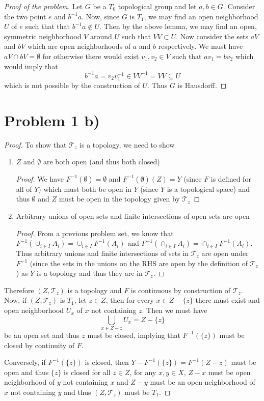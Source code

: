 \begin{proof}[Proof of the problem] 
Let $G$ be a $T_0$ topological group and let $a,b\in G$. Consider the two point $e$ and $b^{-1}a$. Now, since $G$ is $T_1$, we may find an open neighborhood $U$ of $e$ such that that $b^{-1}a\notin U$. Then by the above lemma, we may find an open, symmetric neighborhood $V$ around $U$ such that $VV\subset U$. Now consider the sets $aV$ and $bV$ which are open neighborhoods of $a$ and $b$ respectively. We must have $aV\cap bV = \emptyset$ for otherwise there would exist $v_1,v_2\in V$ such that $a v_1 = b v_2$ which would imply that
\[ b^{-1} a = v_2 v_1^{-1} \in VV^{-1} = VV \subseteq U \]
which is not possible by the construction of $U$. Thus $G$ is Hausdorff.
\end{proof}
\section*{Problem 1 b)}
\begin{proof}
To show that $\mathcal{T}_z$ is a topology, we need to show
\begin{enumerate}
\item $Z$ and $\emptyset$ are both open (and thus both closed)
\begin{proof}
We have $F^{-1}(\emptyset) = \emptyset$ and $F^{-1}(\emptyset)(Z)=Y$ (since $F$ is defined for all of $Y$) which must both be open in $Y$ (since $Y$ is a topological space) and thus $\emptyset$ and $Z$ must be open in the topology given by $\mathcal{T}_z$
\end{proof}
\item Arbitrary unions of open sets and finite intersections of open sets are open
\begin{proof}
From a previous problem set, we know that $F^{-1}(\cup_{i\in I} A_i) = \cup_{i\in I} F^{-1}(A_i)$ and $F^{-1}(\cap_{i\in I} A_i) = \cap_{i\in I} F^{-1}(A_i)$. Thus arbitrary unions and finite intersections of sets in $\mathcal{T}_z$ are open under $F^{-1}$ (since the sets in the unions on the RHS are open by the definition of  $\mathcal{T}_z$)  as $Y$ is a topology and thus they are in $\mathcal{T}_z$.
\end{proof}
\end{enumerate}
Therefore $(Z,\mathcal{T}_z)$ is a topology and $F$ is continuous by construction of $\mathcal{T}_z$.
Now, if $(Z,\mathcal{T}_z)$ is $T_1$, let $z\in Z$, then for every $x\in Z-\{z\}$ there must exist and open neighborhood $U_x$ of $x$ not containing $z$. Then we must have 
\[ \bigcup_{x\in Z-{z}} U_x = Z-\{z\} \]
be an open set and thus ${z}$ must be closed, implying that $F^{-1}(\{z\})$ must be closed by continuity of $F$.  \par
Conversely, if $F^{-1}(\{z\})$ is closed, then $Y-F^{-1}(\{z\})=F^{-1}(Z-{z})$ must be open and thus $\{z\}$ is closed for all $z\in Z$, for any $x,y \in X$, $Z-{x}$ must be open neighborhood of $y$ not containing $x$ and $Z-{y}$ must be an open neighborhood of $x$ not containing $y$ and thus  $(Z,\mathcal{T}_z)$ must be $T_1$.
\end{proof}
